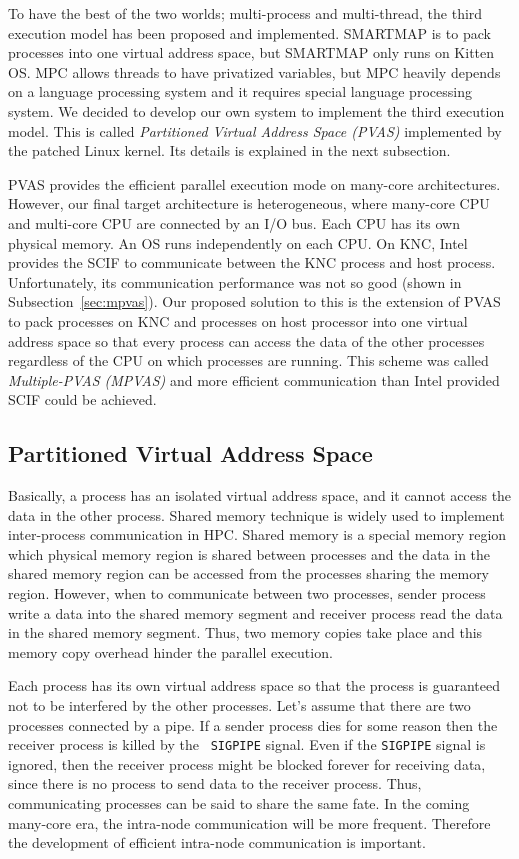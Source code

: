 To have the best of the two worlds; multi-process and multi-thread,
the third execution model has been proposed and implemented. SMARTMAP
is to pack processes into one virtual address space, but SMARTMAP only
runs on Kitten OS\cite{Brightwell:2008:SOS:1413370.1413396}. MPC
allows threads to have privatized variables, but MPC heavily depends
on a language processing system and it requires special language
processing system\cite{pjn2008}. We
decided to develop our own system to implement the third execution
model. This is called {\em Partitioned Virtual Address Space (PVAS)}
implemented by the patched Linux kernel. Its details is explained in
the next subsection. 

PVAS provides the efficient parallel execution mode on many-core
architectures. However, our final target architecture is heterogeneous,
where many-core CPU and multi-core CPU are connected by an I/O
bus. Each CPU has its own physical memory. An OS runs
independently on each CPU. On KNC, Intel provides the SCIF to
communicate between the KNC process and host 
process. Unfortunately, its communication performance was not so
good (shown in Subsection~\ref{sec:mpvas}). Our proposed solution to
this is the extension of PVAS to pack processes on KNC and processes
on host processor into one virtual address space so that every
process can access the data of the other processes regardless of the
CPU on which processes are running. This scheme was called
{\em Multiple-PVAS (MPVAS)} and more efficient communication than Intel
provided SCIF could be achieved. 

\subsection{Partitioned Virtual Address Space}\label{sec:pvas}

Basically, a process has an isolated virtual address space, and it
cannot access the data in the other process. Shared memory technique
is widely used to implement inter-process communication in HPC. Shared
memory is a special memory region which physical memory region is
shared between processes and the data in the shared memory region can
be accessed from the processes sharing the memory region. However,
when to communicate between two processes, sender process write a data
into the shared memory segment and receiver process read the data in
the shared memory segment. Thus, two memory copies take place and this
memory copy overhead hinder the parallel execution.

Each process has its own virtual address space so that the process is
guaranteed not to be interfered by the other processes. Let's assume
that there are two processes connected by a pipe. If a sender process
dies for some reason then the receiver process is killed by the {\tt
SIGPIPE} signal.  Even if the {\tt SIGPIPE} signal is ignored, then the
receiver process might be blocked forever for receiving data, since
there is no process to send data to the receiver process. Thus,
communicating processes can be said to share the same fate. 
In the coming many-core era, the intra-node communication will be more
frequent. Therefore the development of efficient intra-node
communication is important.

